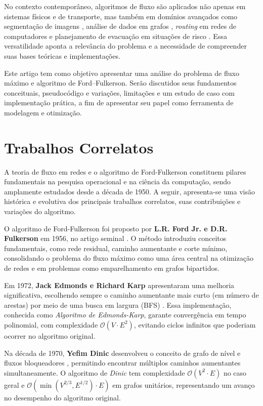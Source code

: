 \documentclass[12pt]{article}
\begin{document}
\noindent No contexto contemporâneo, algoritmos de fluxo são aplicados não apenas em sistemas físicos e de transporte, mas também em domínios avançados como segmentação de imagens \cite{boykov2001}, análise de dados em grafos \cite{ahuja1993}, \emph{routing} em redes de computadores \cite{kleinberg2006} e planejamento de evacuação em situações de risco \cite{chen2010}. Essa versatilidade aponta a relevância do problema e a necessidade de compreender suas bases teóricas e implementações.

\noindent Este artigo tem como objetivo apresentar uma análise do problema de fluxo máximo e algoritmo de Ford–Fulkerson. Serão discutidos seus fundamentos conceituais, pseudocódigo e variações, limitações e um estudo de caso com implementação prática, a fim de apresentar seu papel como ferramenta de modelagem e otimização.

\section{Trabalhos Correlatos} \label{sec:firstpage}

A teoria de fluxo em redes e o algoritmo de Ford-Fulkerson constituem pilares fundamentais na pesquisa operacional e na ciência da computação, sendo amplamente estudados desde a década de 1950. A seguir, apresenta-se uma visão histórica e evolutiva dos principais trabalhos correlatos, suas contribuições e variações do algoritmo.

\noindent O algoritmo de Ford-Fulkerson foi proposto por \textbf{L.R. Ford Jr. e D.R. Fulkerson} em 1956, no artigo seminal \cite{ford1956}. O método introduziu conceitos fundamentais, como rede residual, caminho aumentante e corte mínimo, consolidando o problema do fluxo máximo como uma área central na otimização de redes e em problemas como emparelhamento em grafos bipartidos.

Em 1972, \textbf{Jack Edmonds e Richard Karp} apresentaram uma melhoria significativa, escolhendo sempre o caminho aumentante mais curto (em número de arestas) por meio de uma busca em largura (BFS) \cite{edmonds1972}. Essa implementação, conhecida como \textit{Algoritmo de Edmonds-Karp}, garante convergência em tempo polinomial, com complexidade $\mathcal{O}(V \cdot E^2)$, evitando ciclos infinitos que poderiam ocorrer no algoritmo original.

Na década de 1970, \textbf{Yefim Dinic} desenvolveu o conceito de grafo de nível e fluxos bloqueadores \cite{dinic1970}, permitindo encontrar múltiplos caminhos aumentantes simultaneamente. O algoritmo de \textit{Dinic} tem complexidade $\mathcal{O}(V^2 \cdot E)$ no caso geral e $\mathcal{O}(\min(V^{2/3}, E^{1/2}) \cdot E)$ em grafos unitários, representando um avanço no desempenho do algoritmo original.
\end{document}
